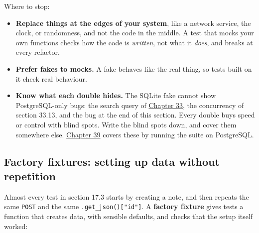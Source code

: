 Where to stop:

\begin{itemize}
\tightlist
\item
  \textbf{Replace things at the edges of your system}, like a network service, the clock, or randomness, and not the code in the middle. A test that mocks your own functions checks how the code is \emph{written}, not what it \emph{does}, and breaks at every refactor.
\item
  \textbf{Prefer fakes to mocks.} A fake behaves like the real thing, so tests built on it check real behaviour.
\item
  \textbf{Know what each double hides.} The SQLite fake cannot show PostgreSQL-only bugs: the search query of \hyperref[ch:33-logic-execution]{Chapter 33}, the concurrency of section 33.13, and the bug at the end of this section. Every double buys speed or control with blind spots. Write the blind spots down, and cover them somewhere else. \hyperref[ch:39-local-vs-production]{Chapter 39} covers these by running the suite on PostgreSQL.
\end{itemize}

\subsection*{Factory fixtures: setting up data without repetition}\label{17-build-process:factory-fixtures-setting-up-data-without-repetition}

Almost every test in section 17.3 starts by creating a note, and then repeats the same \texttt{POST} and the same \texttt{.get\_json(){[}"id"{]}}. A \textbf{factory fixture} gives tests a function that creates data, with sensible defaults, and checks that the setup itself worked:

\begin{codebox}[short]

\begin{Shaded}
\begin{Highlighting}[]

     \OperatorTok{=} \NormalTok{) }\OperatorTok{{-}\textgreater{}} \NormalTok{:}
\OperatorTok{=}\OperatorTok{=}\NormalTok{\{}
        \OperatorTok{==} 

\end{Highlighting}
\end{Shaded}

\end{codebox}

